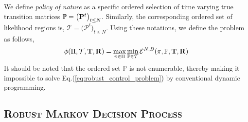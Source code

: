 {We define \textit{policy of nature} as a specific ordered selection of time varying true transition matrices 
$\mathbb{P} = \big( {\mathbf{P}}^t \big)_{t \leq N}$.
Similarly, the corresponding ordered set of likelihood regions is,
$\mathcal{T} = \big(\mathcal{P}^t \big)_{t \leq N}$. 
Using these notations, we define the {\robustproblem} problem as follows,
\begin{equation}
\label{eq:robust_control_problem}
\phi(\Pi, \mathcal{T}, {\mathbf{T}}, {\mathbf{R}}) = \max_{\pi \in \Pi} \min_{\mathbb{P} \in \mathcal{T}} \mathcal{E}^{N,B}(\pi, \mathbb{P}, {\mathbf{T}}, {\mathbf{R}}) \\
\end{equation}
It should be noted that the ordered set $\mathbb{P}$ is not enumerable, thereby making it impossible to solve Eq.(\ref{eq:robust_control_problem}) by conventional dynamic programming.
\fi


\iffalse
\subsection{\textsc{Robust Markov Decision Process}}

}
